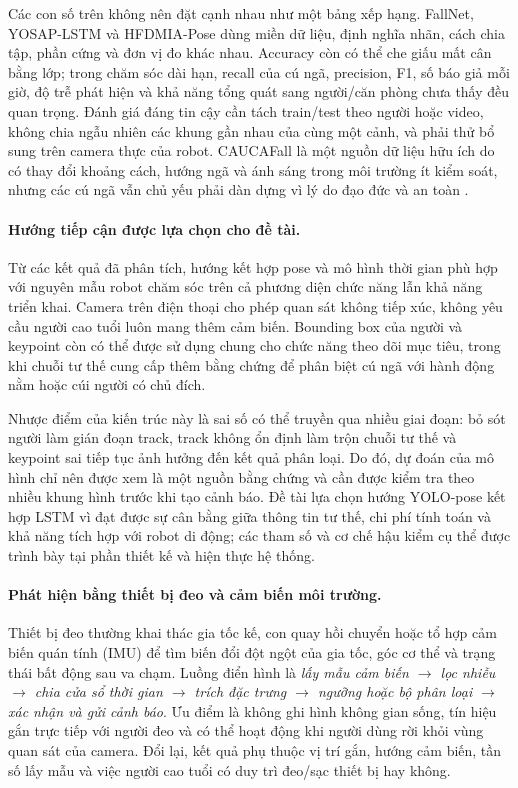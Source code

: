 Các con số trên không nên đặt cạnh nhau như một bảng xếp hạng. FallNet, YOSAP-LSTM và HFDMIA-Pose dùng miền dữ liệu, định nghĩa nhãn, cách chia tập, phần cứng và đơn vị đo khác nhau. Accuracy còn có thể che giấu mất cân bằng lớp; trong chăm sóc dài hạn, recall của cú ngã, precision, F1, số báo giả mỗi giờ, độ trễ phát hiện và khả năng tổng quát sang người/căn phòng chưa thấy đều quan trọng. Đánh giá đáng tin cậy cần tách train/test theo người hoặc video, không chia ngẫu nhiên các khung gần nhau của cùng một cảnh, và phải thử bổ sung trên camera thực của robot. CAUCAFall là một nguồn dữ liệu hữu ích do có thay đổi khoảng cách, hướng ngã và ánh sáng trong môi trường ít kiểm soát, nhưng các cú ngã vẫn chủ yếu phải dàn dựng vì lý do đạo đức và an toàn .

\paragraph{Hướng tiếp cận được lựa chọn cho đề tài.}
Từ các kết quả đã phân tích, hướng kết hợp pose và mô hình thời gian phù hợp với nguyên mẫu robot chăm sóc trên cả phương diện chức năng lẫn khả năng triển khai. Camera trên điện thoại cho phép quan sát không tiếp xúc, không yêu cầu người cao tuổi luôn mang thêm cảm biến. Bounding box của người và keypoint còn có thể được sử dụng chung cho chức năng theo dõi mục tiêu, trong khi chuỗi tư thế cung cấp thêm bằng chứng để phân biệt cú ngã với hành động nằm hoặc cúi người có chủ đích.

Nhược điểm của kiến trúc này là sai số có thể truyền qua nhiều giai đoạn: bỏ sót người làm gián đoạn track, track không ổn định làm trộn chuỗi tư thế và keypoint sai tiếp tục ảnh hưởng đến kết quả phân loại. Do đó, dự đoán của mô hình chỉ nên được xem là một nguồn bằng chứng và cần được kiểm tra theo nhiều khung hình trước khi tạo cảnh báo. Đề tài lựa chọn hướng YOLO-pose kết hợp LSTM vì đạt được sự cân bằng giữa thông tin tư thế, chi phí tính toán và khả năng tích hợp với robot di động; các tham số và cơ chế hậu kiểm cụ thể được trình bày tại phần thiết kế và hiện thực hệ thống.

\iffalse

\paragraph{Phát hiện bằng thiết bị đeo và cảm biến môi trường.}
Thiết bị đeo thường khai thác gia tốc kế, con quay hồi chuyển hoặc tổ hợp cảm biến quán tính (IMU) để tìm biến đổi đột ngột của gia tốc, góc cơ thể và trạng thái bất động sau va chạm. Luồng điển hình là \textit{lấy mẫu cảm biến $\rightarrow$ lọc nhiễu $\rightarrow$ chia cửa sổ thời gian $\rightarrow$ trích đặc trưng $\rightarrow$ ngưỡng hoặc bộ phân loại $\rightarrow$ xác nhận và gửi cảnh báo}. Ưu điểm là không ghi hình không gian sống, tín hiệu gắn trực tiếp với người đeo và có thể hoạt động khi người dùng rời khỏi vùng quan sát của camera. Đổi lại, kết quả phụ thuộc vị trí gắn, hướng cảm biến, tần số lấy mẫu và việc người cao tuổi có duy trì đeo/sạc thiết bị hay không.

